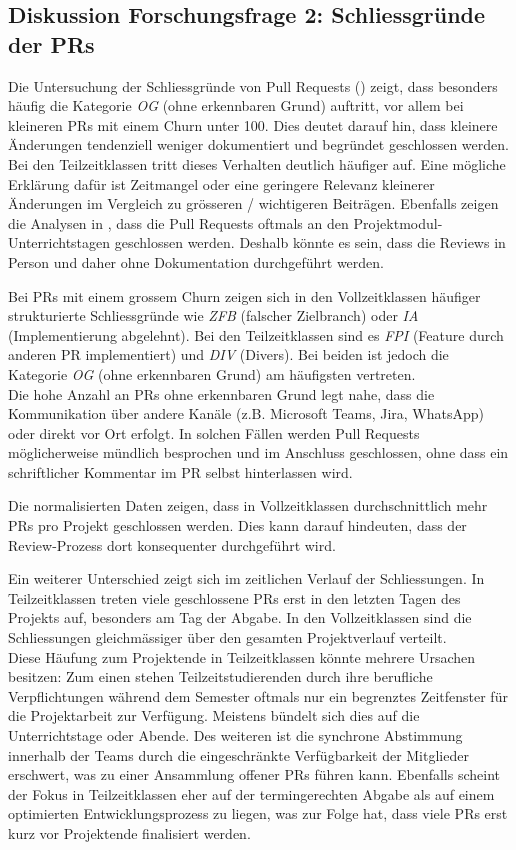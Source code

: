\subsection{Diskussion Forschungsfrage 2: Schliessgründe der PRs}
Die Untersuchung der Schliessgründe von Pull Requests () zeigt, dass besonders häufig die Kategorie \textit{OG} (ohne erkennbaren Grund) auftritt, vor allem bei kleineren PRs mit einem Churn unter 100. Dies deutet darauf hin, dass kleinere Änderungen tendenziell weniger dokumentiert und begründet geschlossen werden. \\
Bei den  Teilzeitklassen tritt dieses Verhalten deutlich häufiger auf. Eine mögliche Erklärung dafür ist Zeitmangel oder eine geringere Relevanz kleinerer Änderungen im Vergleich zu grösseren / wichtigeren Beiträgen. Ebenfalls zeigen die Analysen in , dass die Pull Requests oftmals an den Projektmodul-Unterrichtstagen geschlossen werden. Deshalb könnte es sein, dass die Reviews in Person und daher ohne Dokumentation durchgeführt werden. 

Bei PRs mit einem grossem Churn zeigen sich in den Vollzeitklassen häufiger strukturierte Schliessgründe wie \textit{ZFB} (falscher Zielbranch) oder \textit{IA} (Implementierung
abgelehnt). Bei den Teilzeitklassen sind es \textit{FPI} (Feature durch anderen
PR implementiert) und \textit{DIV} (Divers). Bei beiden ist jedoch die Kategorie \textit{OG} (ohne erkennbaren Grund) am häufigsten vertreten. \\
Die hohe Anzahl an PRs ohne erkennbaren Grund legt nahe, dass die Kommunikation über andere Kanäle (z.B. Microsoft Teams, Jira, WhatsApp) oder direkt vor Ort erfolgt. In solchen Fällen werden Pull Requests möglicherweise mündlich besprochen und im Anschluss geschlossen, ohne dass ein schriftlicher Kommentar im PR selbst hinterlassen wird.

Die normalisierten Daten zeigen, dass in Vollzeitklassen durchschnittlich mehr PRs pro Projekt geschlossen werden. Dies kann darauf hindeuten, dass der Review-Prozess dort konsequenter durchgeführt wird.

Ein weiterer Unterschied zeigt sich im zeitlichen Verlauf der Schliessungen. In Teilzeitklassen treten viele geschlossene PRs erst in den letzten Tagen des Projekts auf, besonders am Tag der Abgabe. In den Vollzeitklassen sind die Schliessungen gleichmässiger über den gesamten Projektverlauf verteilt.  \\
Diese Häufung zum Projektende in Teilzeitklassen könnte mehrere Ursachen besitzen: Zum einen stehen Teilzeitstudierenden durch ihre berufliche Verpflichtungen während dem Semester oftmals nur ein begrenztes Zeitfenster für die Projektarbeit zur Verfügung. Meistens bündelt sich dies auf die Unterrichtstage oder Abende. Des weiteren ist die synchrone Abstimmung innerhalb der Teams durch die eingeschränkte Verfügbarkeit der Mitglieder erschwert, was zu einer Ansammlung offener PRs führen kann. Ebenfalls scheint der Fokus in Teilzeitklassen eher auf der termingerechten Abgabe als auf einem optimierten Entwicklungsprozess zu liegen, was zur Folge hat, dass viele PRs erst kurz vor Projektende finalisiert werden.

